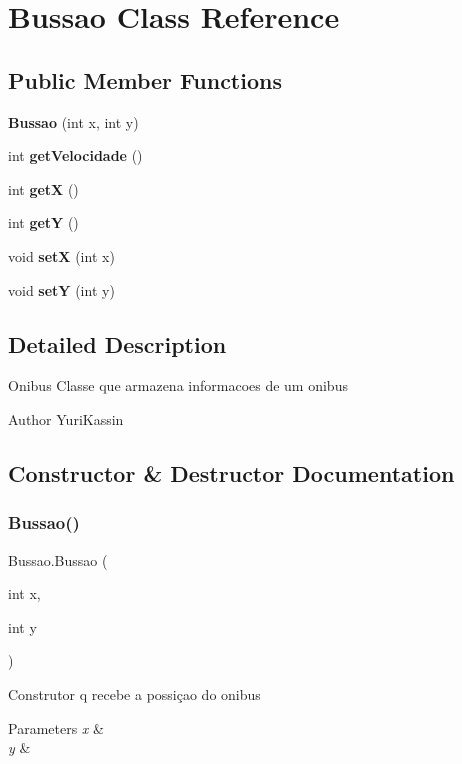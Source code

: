 \section{Bussao Class Reference}
\label{class_bussao}
\subsection*{Public Member Functions}
\begin{DoxyCompactItemize}
\item 
\textbf{ Bussao} (int x, int y)
\item 
int \textbf{ get\+Velocidade} ()
\item 
\mbox{\label{class_bussao_a4f349405b19b5a4b58c3f9dbe4f3f30d}} 
int {\bfseries getX} ()
\item 
\mbox{\label{class_bussao_a8440a65c613c9292e60ae054a10f3aed}} 
int {\bfseries getY} ()
\item 
void \textbf{ setX} (int x)
\item 
\mbox{\label{class_bussao_a66f57ce74ff2679370ba945d99685465}} 
void {\bfseries setY} (int y)
\end{DoxyCompactItemize}


\subsection{Detailed Description}
Onibus Classe que armazena informacoes de um onibus

\begin{DoxyAuthor}{Author}
Yuri\+Kassin 
\end{DoxyAuthor}


\subsection{Constructor \& Destructor Documentation}
\mbox{\label{class_bussao_a885b967d9478e2993f13e3688e936561}} 
\subsubsection{Bussao()}
{\footnotesize\ttfamily Bussao.\+Bussao (\begin{DoxyParamCaption}\item[{int}]{x,  }\item[{int}]{y }\end{DoxyParamCaption})}

Construtor q recebe a possiçao do onibus 
\begin{DoxyParams}{Parameters}
{\em x} & \\
\hline
{\em y} & \\
\hline
\end{DoxyParams}


